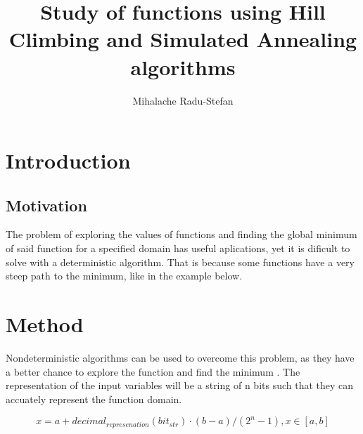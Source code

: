 \documentclass{article}
\author{Mihalache Radu-Stefan}
\title{Study of functions using Hill Climbing and Simulated Annealing algorithms}
\begin{document}
\maketitle

\section{Introduction}
\subsection{Motivation}
The problem of exploring the values of functions and finding the global minimum of said function for a specified domain has useful aplications, yet it is dificult to solve with a deterministic algorithm.
That is because some functions have a very steep path to the minimum, like in the example below.

\begin{figure}[!h]%
  \centering %
\end{figure}

\section{Method}

Nondeterministic algorithms can be used to overcome this problem, as they have a better chance to explore the function and find the minimum . 
\newline
The representation of the input variables will be a string of n bits such that they can accuately represent the function domain.

$$x = a + decimal_{represenation}(bit_{str}) \cdot (b - a)/(2^n - 1) ,  x \in \left[a, b \right]$$
\end{document}
